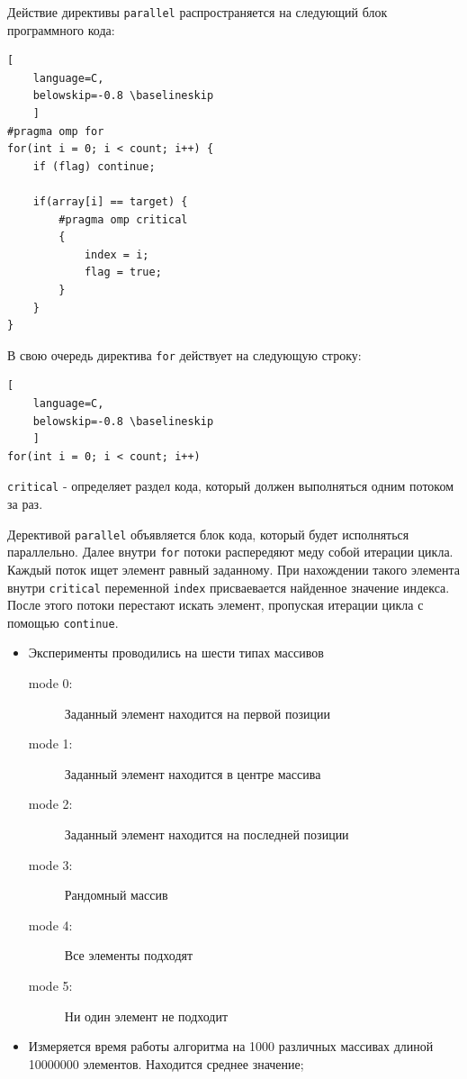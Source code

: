 Действие директивы \verb|parallel| распространяется на следующий блок программного кода:

\begin{lstlisting}[
    language=C,
    belowskip=-0.8 \baselineskip
    ]
#pragma omp for
for(int i = 0; i < count; i++) {
    if (flag) continue;

    if(array[i] == target) {
        #pragma omp critical
        {
            index = i;
            flag = true;
        }
    }
}
\end{lstlisting}

\vspace{10mm}
В свою очередь директива \verb|for| действует на следующую строку:

\begin{lstlisting}[
    language=C,
    belowskip=-0.8 \baselineskip
    ]
for(int i = 0; i < count; i++)
\end{lstlisting}

\vspace{10mm}
\verb|critical| - определяет раздел кода, который должен выполняться одним потоком за раз.

\newpage


Дерективой \verb|parallel| объявляется блок кода, который будет исполняться параллельно. Далее внутри \verb|for| потоки распередяют меду собой итерации цикла. Каждый поток ищет элемент равный заданному. При нахождении такого элемента внутри \verb|critical| переменной \verb|index| присваевается найденное значение индекса. После этого потоки перестают искать элемент, пропуская итерации цикла с помощью \verb|continue|.



\begin{itemize}
    \item Эксперименты проводились на шести типах массивов

\begin{description}
    \item[mode 0:] Заданный элемент находится на первой позиции
    \item[mode 1:] Заданный элемент находится в центре массива
    \item[mode 2:] Заданный элемент находится на последней позиции
    \item[mode 3:] Рандомный массив
    \item[mode 4:] Все элементы подходят
    \item[mode 5:] Ни один элемент не подходит
\end{description}

    \item Измеряется время работы алгоритма на 1\hspace{1mm}000 различных массивах длиной 10\hspace{1mm}000\hspace{1mm}000 элементов. Находится среднее значение;
\end{itemize}

